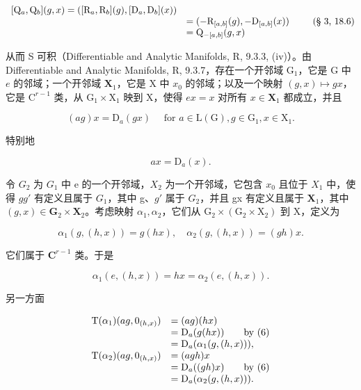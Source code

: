 \[
\begin{array}{r l} {[ \mathrm{Q} _ {a}, \mathrm{Q} _ {b} ] (g, x) = ([ \mathrm{R} _ {a}, \mathrm{R} _ {b} ] (g), [ \mathrm{D} _ {a}, \mathrm{D} _ {b} ] (x))} \\ & = (- \mathrm{R} _ {[ a, b ]} (g), - \mathrm{D} _ {[ a, b ]} (x)) \\ & = \mathrm{Q} _ {- [ a, b ]} (g, x) \end{array}\tag{§ 3, 18.6}
\]

从而 S 可积（Differentiable and Analytic Manifolds, R, 9.3.3, (iv)）。由 Differentiable and Analytic Manifolds, R, 9.3.7，存在一个开邻域 \(\mathrm{G}_1\)，它是 G 中 \(e\) 的邻域；一个开邻域 \(\mathbf{X}_1\)，它是 X 中 \(x_0\) 的邻域；以及一个映射 \((g,x)\mapsto gx\)，它是 \(\mathrm{C}^{r - 1}\) 类，从 \(\mathrm{G}_1\times \mathrm{X}_1\) 映到 X，使得 \(ex = x\) 对所有 \(x\in \mathbf{X}_1\) 都成立，并且

\[
(a g) x = \mathrm{D} _ {a} (g x) \quad \text { for } a \in \mathrm{L} (\mathrm{G}), g \in \mathrm{G} _ {1}, x \in \mathrm{X} _ {1}.\tag{6}
\]

特别地

\[
a x = \mathrm{D} _ {a} (x).\tag{7}
\]

令 \(G_{2}\) 为 \(G_{1}\) 中 e 的一个开邻域，\(X_{2}\) 为一个开邻域，它包含 \(x_{0}\) 且位于 \(X_{1}\) 中，使得 \(gg'\) 有定义且属于 \(G_{1}\)，其中 g、\(g'\) 属于 \(G_{2}\)，并且 gx 有定义且属于 \(\mathbf{X}_1\)，其中 \((g,x)\in \mathbf{G}_2\times \mathbf{X}_2\)。考虑映射 \(\alpha_{1},\alpha_{2}\)，它们从 \(\mathrm{G}_2\times (\mathrm{G}_2\times \mathrm{X}_2)\) 到 X，定义为

\[
\alpha_ {1} (g, (h, x)) = g (h x), \quad \alpha_ {2} (g, (h, x)) = (g h) x.
\]

它们属于 \(\mathbf{C}^{r - 1}\) 类。于是

\[
\alpha_ {1} (e, (h, x)) = h x = \alpha_ {2} (e, (h, x)).
\]

另一方面

\[
\begin{array}{r l} \mathrm{T} (\alpha_ {1}) (a g, 0 _ {(h, x)}) & = (a g) (h x) \\ & = \mathrm{D} _ {a} (g (h x)) \qquad \text {by (6)} \\ & = \mathrm{D} _ {a} (\alpha_ {1} (g, (h, x))), \\ \mathrm{T} (\alpha_ {2}) (a g, 0 _ {(h, x)}) & = (a g h) x \\ & = \mathrm{D} _ {a} ((g h) x) \qquad \text {by (6)} \\ & = \mathrm{D} _ {a} (\alpha_ {2} (g, (h, x))). \end{array}
\]

